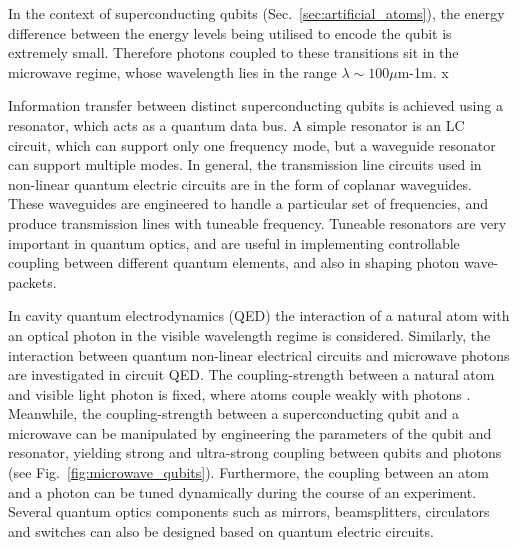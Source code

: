 In the context of superconducting qubits (Sec.~\ref{sec:artificial_atoms}), the energy difference between the energy levels being utilised to encode the qubit is extremely small. Therefore photons coupled to these transitions sit in the microwave regime, whose wavelength lies in the range \mbox{$\lambda\sim100\mu$m-1m}.
x

Information transfer between distinct superconducting qubits is achieved using a resonator, which acts as a quantum data bus. A simple resonator is an LC circuit, which can support only one frequency mode, but a waveguide resonator can support multiple modes. In general, the transmission line circuits used in non-linear quantum electric circuits are in the form of coplanar waveguides. These waveguides are engineered to handle a particular set of frequencies, and produce transmission lines with tuneable frequency. Tuneable resonators are very important in quantum optics, and are useful in implementing controllable coupling between different quantum elements, and also in shaping photon wave-packets. 

In cavity quantum electrodynamics (QED) the interaction of a natural atom with an optical photon in the visible wavelength regime is considered. Similarly, the interaction between quantum non-linear electrical circuits and  microwave photons are investigated in circuit QED. The coupling-strength between a natural atom and visible light photon is fixed, where atoms couple weakly with photons \cite{bib:raimond2001manipulating}. Meanwhile, the coupling-strength between a superconducting qubit and a microwave can be manipulated by engineering the parameters of the qubit and resonator, yielding strong and ultra-strong coupling between qubits and photons \cite{bib:wallraff2004strong} (see Fig.~\ref{fig:microwave_qubits}). Furthermore, the coupling between an atom and a photon can be tuned dynamically during the course of an experiment. Several quantum optics components such as mirrors, beamsplitters, circulators and switches can also be designed based on quantum electric circuits.

